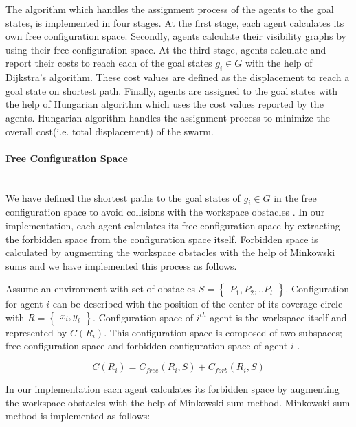 The algorithm which handles the assignment process of the agents to the goal states, is implemented in four stages. At the first stage, each agent calculates its own free configuration space. Secondly, agents calculate their visibility graphs by using their free configuration space. At the third stage,  agents calculate and report their costs to reach each of the goal states $g_i \in G$ with the help of Dijkstra's algorithm. These cost values are defined as the displacement to reach a goal state on shortest path.  Finally, agents are assigned to the goal states with the help of Hungarian algorithm which uses the cost values reported by the agents. Hungarian algorithm handles the assignment process to minimize the overall cost(i.e. total displacement) of the swarm.
	
\paragraph{Free Configuration Space}\hspace{0pt} \\
We have defined the shortest paths to the goal states of $g_i \in G$ in the free configuration space to avoid collisions with the workspace obstacles \cite{92}. In our implementation, each agent calculates its free configuration space by extracting the forbidden space from the configuration space itself. Forbidden space is calculated by augmenting the workspace obstacles with the help of Minkowski sums and we have implemented this process as follows.

Assume an environment with set of obstacles $S = \begin{Bmatrix}
P_1, P_2, .. P_t \end{Bmatrix}$. Configuration for agent $i$ can be described with the position of the center of its coverage circle with $R=\begin{Bmatrix}x_i, y_i\end{Bmatrix}$. Configuration space of $i^{th}$ agent is the workspace itself and represented by $C(R_i)$. This configuration space is composed of two subspaces; free configuration space and forbidden configuration space of agent $i$ \cite{92}.

\begin{equation}
C(R_i) = C_{free}(R_i,S) + C_{forb}(R_i,S)
\end{equation}

In our implementation each agent calculates its forbidden space by augmenting the workspace obstacles with the help of Minkowski sum method. Minkowski sum method is implemented as follows:

